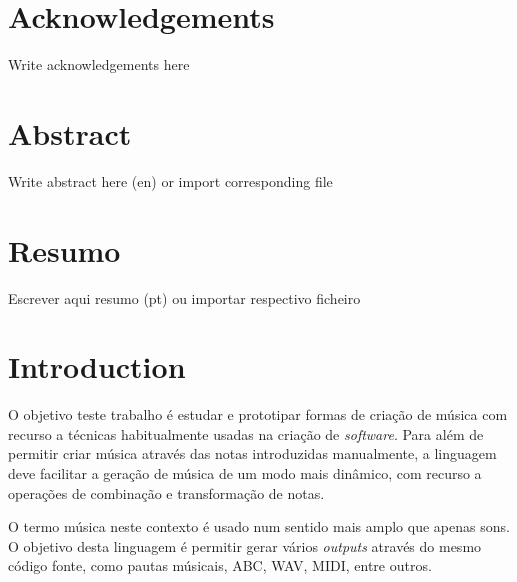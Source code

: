 \documentclass[
  oneside,
  11pt, a4paper,
  footinclude=true,
  headinclude=true,
  cleardoublepage=empty
]{scrbook}
\author{Pedro M. Silva}
\date{\myear} %
\begin{document}
	\umfrontcover	
	\umtitlepage
	
	\chapter*{Acknowledgements}
	Write acknowledgements here


	\chapter*{Abstract}
	Write abstract here (en) or import corresponding file
	
	\cleardoublepage
	\chapter*{Resumo}
	Escrever aqui resumo (pt) ou importar respectivo ficheiro
	
	

	\tableofcontents
	\listoffigures
	\listoftables
	
	
	
	\chapter{Introduction}
	
    O objetivo teste trabalho é estudar e prototipar formas de criação de música com recurso a técnicas habitualmente usadas na criação de \textit{software}. Para além de permitir criar música através das notas introduzidas manualmente, a linguagem deve facilitar a geração de música de um modo mais dinâmico, com recurso a operações de combinação e transformação de notas.
    
    O termo música neste contexto é usado num sentido mais amplo que apenas sons. O objetivo desta linguagem é permitir gerar vários \textit{outputs} através do mesmo código fonte, como pautas músicais, ABC, WAV, MIDI, entre outros.
\end{document}
